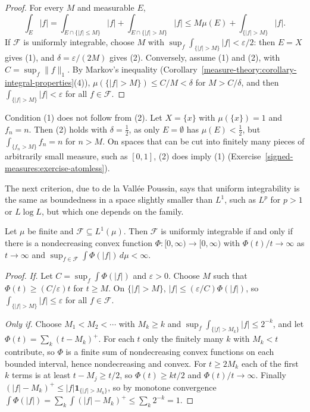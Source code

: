 \begin{proof}
For every $M$ and measurable $E$,
\[
\int_E|f| = \int_{E \cap \{|f| \leq M\}}|f| + \int_{E \cap \{|f| > M\}}|f| \leq M\mu(E) + \int_{\{|f| > M\}}|f| .
\]
If $\mathcal{F}$ is uniformly integrable, choose $M$ with $\sup_f\int_{\{|f| > M\}}|f| < \varepsilon/2$: then $E = X$ gives (1), and $\delta = \varepsilon/(2M)$ gives (2). Conversely, assume (1) and (2),
with $C = \sup_f\|f\|_1$. By Markov's inequality (Corollary~\ref{measure-theory:corollary-integral-properties}(4)), $\mu(\{|f| > M\}) \leq C/M < \delta$ for $M > C/\delta$, and then
$\int_{\{|f| > M\}}|f| < \varepsilon$ for all $f \in \mathcal{F}$.
\end{proof}

\begin{counterexample}\label{signed-measures:counterexample-uniformly-integrable}
Condition (1) does not follow from (2). Let $X = \{x\}$ with $\mu(\{x\}) = 1$ and $f_n = n$. Then (2) holds with $\delta = \frac12$, as only $E = \emptyset$ has $\mu(E) < \frac12$, but
$\int_{\{f_n > M\}}f_n = n$ for $n > M$. On spaces that can be cut into finitely many pieces of arbitrarily small measure, such as $[0, 1]$, (2) does imply (1)
(Exercise~\ref{signed-measures:exercise-atomless}).
\end{counterexample}

The next criterion, due to de la Vall\'ee Poussin, says that uniform integrability is the same as boundedness in a space slightly smaller than $L^1$, such as $L^p$ for $p > 1$ or $L\log L$, but
which one depends on the family.

\begin{theorem}\label{signed-measures:theorem-de-la-vallee-poussin}
Let $\mu$ be finite and $\mathcal{F} \subseteq L^1(\mu)$. Then $\mathcal{F}$ is uniformly integrable if and only if there is a nondecreasing convex function $\Phi \colon [0, \infty) \to [0, \infty)$ with
$\Phi(t)/t \to \infty$ as $t \to \infty$ and $\sup_{f \in \mathcal{F}}\int\Phi(|f|)\,d\mu < \infty$.
\end{theorem}

\begin{proof}
\emph{If.} Let $C = \sup_f\int\Phi(|f|)$ and $\varepsilon > 0$. Choose $M$ such that $\Phi(t) \geq (C/\varepsilon)t$ for $t \geq M$. On $\{|f| > M\}$, $|f| \leq (\varepsilon/C)\Phi(|f|)$, so
$\int_{\{|f| > M\}}|f| \leq \varepsilon$ for all $f \in \mathcal{F}$.

\emph{Only if.} Choose $M_1 < M_2 < \cdots$ with $M_k \geq k$ and $\sup_f\int_{\{|f| > M_k\}}|f| \leq 2^{-k}$, and let $\Phi(t) = \sum_k(t - M_k)^+$. For each $t$ only the finitely many $k$ with
$M_k < t$ contribute, so $\Phi$ is a finite sum of nondecreasing convex functions on each bounded interval, hence nondecreasing and convex. For $t \geq 2M_k$ each of the first $k$ terms is at least
$t - M_j \geq t/2$, so $\Phi(t) \geq kt/2$ and $\Phi(t)/t \to \infty$. Finally $(|f| - M_k)^+ \leq |f|\mathbf{1}_{\{|f| > M_k\}}$, so by monotone convergence
$\int\Phi(|f|) = \sum_k\int(|f| - M_k)^+ \leq \sum_k2^{-k} = 1$.
\end{proof}

